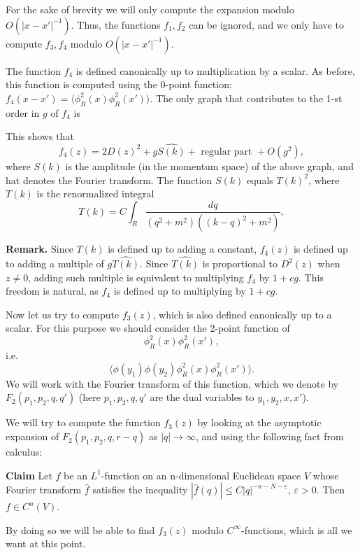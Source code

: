 \documentclass[11pt]{article}
\def\<{\langle}
\def\>{\rangle}
\def\e{\varepsilon}
\begin{document}
For the sake of brevity we will only compute the expansion
modulo $O(|x-x'|^{-1})$. Thus, the functions $f_1,f_2$ can be ignored, 
and we only have to compute $f_3,f_4$ modulo $O(|x-x'|^{-1})$.

The function $f_4$ is defined canonically
up to multiplication by a scalar. 
As before, this function is computed using the 0-point function:
$f_4(x-x')=\<\phi^2_R(x)\phi^2_R(x')\>$. The only graph 
that contributes to the 1-st order in $g$ of $f_4$ is


\begin{center} 
 
 
\end{center}

This shows that 
$$
f_4(z)=2D(z)^2+g\widehat{S(k)}+\text{ regular part }+O(g^2),
$$
where $S(k)$ is the amplitude (in the momentum space) of the above graph,
and hat denotes the Fourier transform. The function $S(k)$
equals $T(k)^2$, where $T(k)$ is the renormalized integral 
$$
T(k)=C\int_R \frac{dq}{(q^2+m^2)((k-q)^2+m^2)},
$$

{\bf Remark.} Since $T(k)$ is defined up to adding a constant, 
$f_4(z)$ is defined up to adding a multiple of 
$g\widehat{T(k)}$. Since $\widehat{T(k)}$ is proportional to $D^2(z)$
when $z\ne 0$, adding such multiple is equivalent to multiplying 
$f_4$ by $1+cg$. This freedom is natural, as $f_4$ is defined 
up to multiplying by $1+cg$. 

Now let us try to compute $f_3(z)$, which is also defined canonically 
up to a scalar. 
 For this purpose we should consider the 2-point function of
\[ \phi^2_R(x)\phi^2_R(x'),\] i.e.
\[ \<\phi(y_1)\phi(y_2)\phi^2_R(x)\phi^2_R(x')\>.\] 
We will work with the Fourier transform of this function,
which we denote by $F_2(p_1,p_2,q,q')$ (here $p_1,p_2,q,q'$
are the dual variables to $y_1,y_2,x,x'$).

We will try to compute the function $f_3(z)$
by looking at the asymptotic expansion of $F_2(p_1,p_2,q,r-q)$ 
as $|q|\to \infty$, and using the 
following fact from calculus:

\vskip 0.05in

{\bf Claim} 
Let $f$ be an $L^1$-function on an n-dimensional Euclidean space
$V$ whose Fourier transform $\hat f$ satisfies the inequality 
$|\hat f(q)|\le C|q|^{-n-N-\e}$, $\e>0$. Then $f\in C^n(V)$. 
 
\vskip 0.05in

By doing so we will be able 
to find $f_3(z)$ modulo $C^{\infty}$-functions,
which is all we want at this point. 
\end{document}
